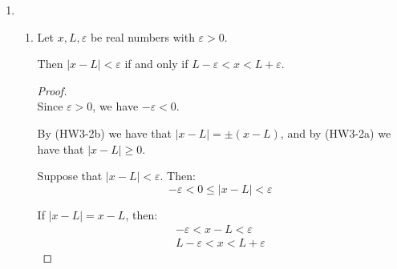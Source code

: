 \documentclass[12pt, letterpaper]{article}
\renewcommand{\epsilon}{\varepsilon}
\theoremstyle{definition} %
\begin{document}
\begin{enumerate}[label=\bfseries\arabic*.]
\begin{enumerate}[label=\bfseries(\alph*)]
\begin{proof}
        By (1b), the constant sequence $(c)_{n \geq 1}$ converges to $c$.

        As proved in lecture, the product of two convergent sequences converges 
        to the product of their limits. Hence, $(cx_n)_{n \geq 1}$ converges to 
        $cL$ for any constant $c$.
    \end{proof}

    \item If $(x_n)_{n \geq 1}$ converges to $L$ and $(y_n)_{n \geq 1}$ converges
    to $L'$, then $(x_n - y_n)_{n \geq 1}$ converges to $L-L'$.

    \begin{proof} ~\\
        By (1c), we have that $(-y_n)_{n \geq 1}$ converges to $-L'$.

        We showed in class that the sum of two convergent sequences converges to 
        the sum of their limits. Hence, $(x_n - y_n)_{n \geq 1}$ converges to
        $L-L'$.
    \end{proof}
\end{enumerate}

\item 
\begin{enumerate}[label=\bfseries(\alph*)]
        
    \item Let $x,L,\epsilon$ be real numbers with $\epsilon > 0$. 
    
    Then $|x-L| < \epsilon$ if and only if $L-\epsilon < x < L+\epsilon$.
    \begin{proof} ~\\
        Since $\epsilon > 0$, we have $-\epsilon < 0$.

        By (HW3-2b) we have that $|x-L| = \pm(x-L)$, and by (HW3-2a) we have that
        $|x-L| \geq 0$. 


        Suppose that $|x-L| < \epsilon$. Then:
        \begin{equation*}
            -\epsilon < 0 \leq |x-L| < \epsilon
        \end{equation*}

        If $|x-L| = x-L$, then:
        \begin{eqnarray*}
            -\epsilon < x-L < \epsilon \\
            L - \epsilon < x < L + \epsilon 
        \end{eqnarray*}


\end{proof}
\end{enumerate}
\end{enumerate}
\end{document}
